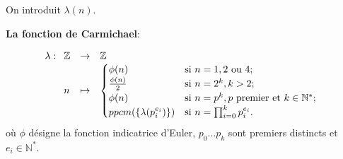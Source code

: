 		On introduit $\lambda(n)$.
		\begin{definition}{\bf La fonction de Carmichael\cite{carmichael1914theory}}:
		
		\begin{equation}
				\lambda : \begin{array}[t]{lcl} \mathbb{Z} &\rightarrow &   \mathbb{Z}  \\
					n&\mapsto& \begin{cases}
						\phi(n) &\text{si } n = 1,2\text{ ou } 4;\\
						\frac{\phi(n)}{2} &\text{si } n = 2^k, k>2; \\
						\phi(n) &\text{si } n = p^k, p\text{ premier et } k \in \mathbb{N^*}; \\
						ppcm(\{\lambda(p_i^{e_i})\})& \text{si } n = \prod_{i = 0}^{k} p_i^{e_i}.
					\end{cases}
				 \end{array}
		\end{equation}
		où $\phi$ désigne la fonction indicatrice d'Euler, $p_0 \dots p_k$ sont premiers distincts et $e_i \in \mathbb{N^*}$.
	
%		
%		
%
%			
%
		\end{definition}
